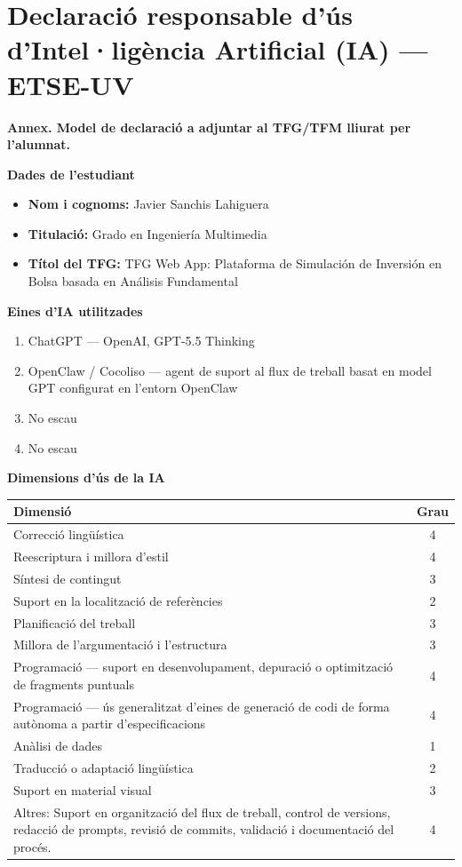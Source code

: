 \chapter*{Declaració responsable d’ús d’Intel·ligència Artificial (IA) --- ETSE-UV}

\textbf{Annex. Model de declaració a adjuntar al TFG/TFM lliurat per l’alumnat.}

\vspace{1em}

\textbf{Dades de l’estudiant}

\begin{itemize}
  \item \textbf{Nom i cognoms:} Javier Sanchis Lahiguera
  \item \textbf{Titulació:} Grado en Ingeniería Multimedia
  \item \textbf{Títol del TFG:} TFG Web App: Plataforma de Simulación de Inversión en Bolsa basada en Análisis Fundamental
\end{itemize}

\textbf{Eines d'IA utilitzades}

\begin{enumerate}
  \item ChatGPT --- OpenAI, GPT-5.5 Thinking
  \item OpenClaw / Cocoliso --- agent de suport al flux de treball basat en model GPT configurat en l'entorn OpenClaw
  \item No escau
  \item No escau
\end{enumerate}

\textbf{Dimensions d'ús de la IA}

\begin{center}
\begin{tabular}{p{}c}
\hline
\textbf{Dimensió} & \textbf{Grau} \\
\hline
Correcció lingüística & 4 \\
Reescriptura i millora d'estil & 4 \\
Síntesi de contingut & 3 \\
Suport en la localització de referències & 2 \\
Planificació del treball & 3 \\
Millora de l'argumentació i l'estructura & 3 \\
Programació --- suport en desenvolupament, depuració o optimització de fragments puntuals & 4 \\
Programació --- ús generalitzat d'eines de generació de codi de forma autònoma a partir d'especificacions & 4 \\
Anàlisi de dades & 1 \\
Traducció o adaptació lingüística & 2 \\
Suport en material visual & 3 \\
Altres: Suport en organització del flux de treball, control de versions, redacció de prompts, revisió de commits, validació i documentació del procés. & 4 \\
\hline
\end{tabular}
\end{center}

